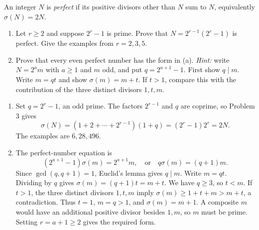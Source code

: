 An integer $N$ is \emph{perfect} if its positive divisors other than $N$
sum to $N$, equivalently $\sigma(N)=2N$.
\begin{enumerate}
  \item Let $r\ge2$ and suppose $2^r-1$ is prime. Prove that
  $N=2^{r-1}(2^r-1)$ is perfect. Give the examples from $r=2,3,5$.
  \item Prove that every even perfect number has the form in (a).
  \emph{Hint:} write $N=2^a m$ with $a\ge1$ and $m$ odd, and put
  $q=2^{a+1}-1$. First show $q\mid m$. Write $m=qt$ and show
  $\sigma(m)=m+t$. If $t>1$, compare this with the contribution of
  the three distinct divisors $1,t,m$. 
\end{enumerate}
\begin{solution}
\begin{enumerate}
  \item Set $q=2^r-1$, an odd prime. The factors $2^{r-1}$ and
  $q$ are coprime, so Problem 3 gives
  \[
    \sigma(N)=(1+2+\cdots+2^{r-1})(1+q)
      =(2^r-1)2^r=2N.
  \]
  The examples are $6,28,496$.
  \item The perfect-number equation is
  \[
    (2^{a+1}-1)\sigma(m)=2^{a+1}m,
    \quad\text{or}\quad q\sigma(m)=(q+1)m.
  \]
  Since $\gcd(q,q+1)=1$, Euclid's lemma gives $q\mid m$.
  Write $m=qt$. Dividing by $q$ gives
  $\sigma(m)=(q+1)t=m+t$. We have $q\ge3$, so $t<m$.
  If $t>1$, the three distinct divisors $1,t,m$ imply
  $\sigma(m)\ge1+t+m>m+t$, a contradiction. Thus $t=1$,
  $m=q>1$, and $\sigma(m)=m+1$. A composite $m$ would have
  an additional positive divisor besides $1,m$, so $m$ must be
  prime. Setting $r=a+1\ge2$ gives the required form.
\end{enumerate}
\end{solution}


